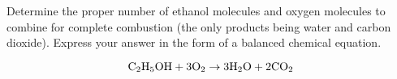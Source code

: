 

Determine the proper number of ethanol molecules and oxygen molecules to combine for complete combustion (the only products being water and carbon dioxide).  Express your answer in the form of a balanced chemical equation.







$$\hbox{C}_2 \hbox{H}_5 \hbox{OH} + 3 \hbox{O}_2 \to 3 \hbox{H}_2\hbox{O} + 2 \hbox{CO}_2$$











